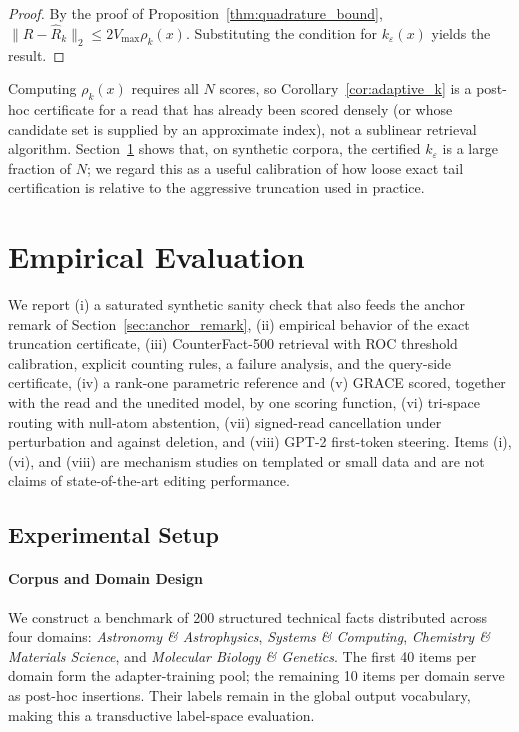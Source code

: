 \documentclass[preprint,12pt]{elsarticle}
\begin{document}
\begin{proof}
By the proof of Proposition~\ref{thm:quadrature_bound}, $\|R - \hat R_k\|_2 \le 2 V_{\max} \rho_k(x)$. Substituting the condition for $k_\varepsilon(x)$ yields the result. \qedhere
\end{proof}

Computing $\rho_k(x)$ requires all $N$ scores, so Corollary~\ref{cor:adaptive_k} is a post-hoc certificate for a read that has already been scored densely (or whose candidate set is supplied by an approximate index), not a sublinear retrieval algorithm. Section~\ref{sec:empirical} shows that, on synthetic corpora, the certified $k_\varepsilon$ is a large fraction of $N$; we regard this as a useful calibration of how loose exact tail certification is relative to the aggressive truncation used in practice.

\section{Empirical Evaluation}
\label{sec:empirical}

We report (i) a saturated synthetic sanity check that also feeds the anchor remark of Section~\ref{sec:anchor_remark}, (ii) empirical behavior of the exact truncation certificate, (iii) CounterFact-500 retrieval with ROC threshold calibration, explicit counting rules, a failure analysis, and the query-side certificate, (iv) a rank-one parametric reference and (v) GRACE scored, together with the read and the unedited model, by one scoring function, (vi) tri-space routing with null-atom abstention, (vii) signed-read cancellation under perturbation and against deletion, and (viii) GPT-2 first-token steering. Items (i), (vi), and (viii) are mechanism studies on templated or small data and are not claims of state-of-the-art editing performance.

\subsection{Experimental Setup}

\paragraph{Corpus and Domain Design}
We construct a benchmark of 200 structured technical facts distributed across four domains: \emph{Astronomy \& Astrophysics}, \emph{Systems \& Computing}, \emph{Chemistry \& Materials Science}, and \emph{Molecular Biology \& Genetics}. The first 40 items per domain form the adapter-training pool; the remaining 10 items per domain serve as post-hoc insertions. Their labels remain in the global output vocabulary, making this a transductive label-space evaluation.
\end{document}
